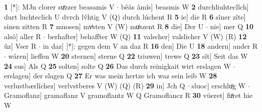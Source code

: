 \documentclass[8pt,a4paper,notitlepage]{article}
\begin{document}
\begin{table}[ht]
\begin{minipage}[t]{0.5\linewidth}
\textbf{1} [*]: MJn clorer suͤzzer beasamis V  $\cdot$ bêâs âmîs] beasmis W \textbf{2} durchliuhteclîch] durt luchteclich U dvrch lv́htig V (Q) durch lúchent R \textbf{5} ie] die R \textbf{6} sîner zîte] sinen zitten R \textbf{7} muosen] mvͤsten V (W) muͦszent R \textbf{8} die] Der U  $\cdot$ nie] mer Q \textbf{10} alsô] aller R  $\cdot$ berhafter] behaffter W (Q) \textbf{11} valscher] valslicher V (W) (R) \textbf{12} ûz] Vser R  $\cdot$ in daz] [*]: gegen dem V an daz R \textbf{16} den] Die U \textbf{18} andern] ander R  $\cdot$ wâren] lieffen W \textbf{20} sternen] sterne Q \textbf{22} triuwen] trewe Q \textbf{23} sît] Seit das W \textbf{24} sus] Als Q \textbf{25} solten] solte Q \textbf{26} Das durch reinigkait wirt erslagen W  $\cdot$ erslagen] der slagen Q \textbf{27} Er was mein hertze ich waz sein leib W \textbf{28} verlustbærlîchez] verlvstberes V (W) (Q) (R) \textbf{29} in] Jch Q  $\cdot$ sluoc] erschluͦg W  $\cdot$ Gramoflanz] gramaflanz V gramoflantz W Q Gramoflancz R \textbf{30} vüeret] fuͤret hie W \newline
\end{minipage}
\end{table}
\end{document}
